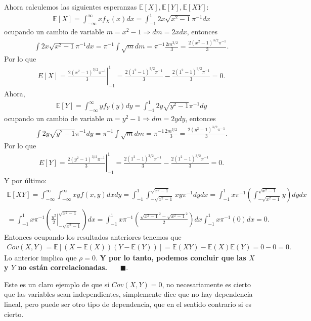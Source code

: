 \documentclass[11pt,letterpaper]{article}
\newcommand{\mE}{\mathbb{E}}
\newcommand{\fin}{$\blacksquare.$}
\newcommand{\intim}{\int_{-\infty}^\infty}
\newcommand{\fx}{f_X(x)}
\newcommand{\fy}{f_Y(y)}
\begin{document}
Ahora calculemos las siguientes esperanzas $\mE[X], \mE[Y], \mE[XY]:$
\begin{align*}
\mE[X]=\intim x \fx dx = \int_{-1}^1 2x\sqrt{x^2-1}\pi^{-1}dx
\end{align*}
ocupando un cambio de variable $m=x^2-1\Rightarrow dm =2xdx$, entonces 
\begin{align*}
\int 2x\sqrt{x^2-1}\pi^{-1}dx=\pi^{-1}\int \sqrt{m} dm=\pi^{-1}\frac{2m^{3/2}}{3} = \frac{2(x^2-1)^{3/2} \pi^{-1}}{3}.
\end{align*}
Por lo que 
\begin{align*}
E[X]=\left. \frac{2(x^2-1)^{3/2} \pi^{-1}}{3} \right|_{-1}^1=\frac{2(1^2-1)^{3/2} \pi^{-1}}{3}-\frac{2(1^2-1)^{3/2} \pi^{-1}}{3}=0.
\end{align*}
Ahora,
\begin{align*}
\mE[Y]=\intim y \fy dy = \int_{-1}^1 2y\sqrt{y^2-1}\pi^{-1}dy
\end{align*}
ocupando un cambio de variable $m=y^2-1\Rightarrow dm =2ydy$, entonces 
\begin{align*}
\int 2y\sqrt{y^2-1}\pi^{-1}dy=\pi^{-1}\int \sqrt{m} dm=\pi^{-1}\frac{2m^{3/2}}{3} = \frac{2(y^2-1)^{3/2} \pi^{-1}}{3}.
\end{align*}
Por lo que 
\begin{align*}
E[Y]=\left. \frac{2(y^2-1)^{3/2} \pi^{-1}}{3} \right|_{-1}^1=\frac{2(1^2-1)^{3/2} \pi^{-1}}{3}-\frac{2(1^2-1)^{3/2} \pi^{-1}}{3}=0.
\end{align*}
Y por último:
\begin{align*}
\mE[XY]=\intim\intim xy f(x,y) dx dy = \int_{-1}^1 \int_{-\sqrt{x^2-1}}^{\sqrt{x^2-1}} xy\pi^{-1}dydx=\int_{-1}^1 x\pi^{-1}\left( \int_{-\sqrt{x^2-1}}^{\sqrt{x^2-1}} y\right) dydx \\ \\
=\int_{-1}^1 x\pi^{-1}\left(\left. \frac{y^2}{2}\right|_{-\sqrt{x^2-1}}^{\sqrt{x^2-1}} \right) dx =\int_{-1}^1 x\pi^{-1}\left( \frac{{\sqrt{x^2-1}}^2-\sqrt{x^2-1}^2}{2} \right) dx \int_{-1}^1 x\pi^{-1}\left(0 \right) dx =0.
\end{align*}
Entonces ocupando los resultados anteriores tenemos que 
\begin{align*}
Cov(X,Y)=\mE[(X-\mE(X))(Y-\mE(Y))]=\mE(XY)-\mE(X)\mE(Y)=0-0=0.
\end{align*}
Lo anterior implica que $\rho=0.$ \textbf{Y por lo tanto, podemos concluir que las $X$ y $Y$ no están correlacionadas.} \ \ \ \fin

Este es un claro ejemplo de que si $Cov(X,Y)=0$, no necesariamente es cierto que las variables sean independientes, simplemente dice que no hay dependencia lineal, pero puede ser otro tipo de dependencia, que en el sentido contrario si es cierto. 
\end{document}
